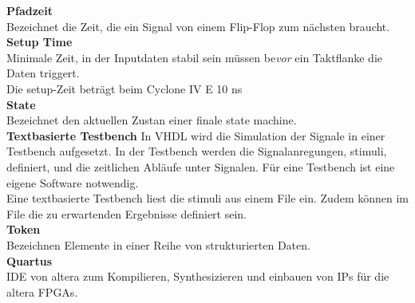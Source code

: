 \textbf{Pfadzeit}\\
Bezeichnet die Zeit, die ein Signal von einem Flip-Flop zum nächsten braucht.\\

\textbf{Setup Time} \\
Minimale Zeit, in der Inputdaten stabil sein müssen be\textit{vor} ein Taktflanke die Daten triggert.\\
Die setup-Zeit beträgt beim Cyclone IV E 10 ns \cite{Handbook_Altera}\\

\textbf{State}\\
Bezeichnet den aktuellen Zustan einer finale state machine. \\

\textbf{Textbasierte Testbench}
In VHDL wird die Simulation der Signale in einer Testbench aufgesetzt. In der Testbench werden die Signalanregungen, stimuli, definiert, und die zeitlichen Abläufe unter Signalen. Für eine Testbench ist eine eigene Software notwendig.\\
Eine textbasierte Testbench liest die stimuli aus einem File ein. Zudem können im File die zu erwartenden Ergebnisse definiert sein.\\

\textbf{Token}\\
Bezeichnen Elemente in einer Reihe von strukturierten Daten.\\

\textbf{Quartus}\\
IDE von altera zum Kompilieren, Synthesizieren und einbauen von IPs für die altera FPGAs.\\
